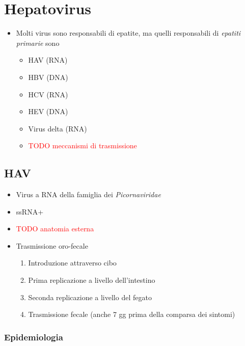 \documentclass[italian,]{article}
\providecommand{\tightlist}{%
  \setlength{\itemsep}{0pt}\setlength{\parskip}{0pt}}
\newcommand{\TODO}[1]{\textcolor{red}{\textsf{\footnotesize{TODO #1}}}} %
\begin{document}
\hypertarget{hepatovirus}{%
\section{Hepatovirus}\label{hepatovirus}}

\begin{itemize}
\tightlist
\item
  Molti virus sono responsabili di epatite, ma quelli responsabili di
  \emph{epatiti primarie} sono

  \begin{itemize}
  \item
    HAV (RNA)
  \item
    HBV (DNA)
  \item
    HCV (RNA)
  \item
    HEV (DNA)
  \item
    Virus delta (RNA)
  \item
    \TODO{meccanismi di trasmissione}
  \end{itemize}
\end{itemize}

\hypertarget{hav}{%
\subsection{HAV}\label{hav}}

\begin{itemize}
\item
  Virus a RNA della famiglia dei \emph{Picornaviridae}
\item
  ssRNA+
\item
  \TODO{anatomia esterna}
\item
  Trasmissione oro-fecale

  \begin{enumerate}
  \def\labelenumi{\arabic{enumi}.}
  \tightlist
  \item
    Introduzione attraverso cibo
  \item
    Prima replicazione a livello dell'intestino
  \item
    Seconda replicazione a livello del fegato
  \item
    Trasmissione fecale (anche 7 gg prima della comparsa dei sintomi)
  \end{enumerate}
\end{itemize}

\hypertarget{epidemiologia-6}{%
\subsubsection{Epidemiologia}\label{epidemiologia-6}}
\end{document}
